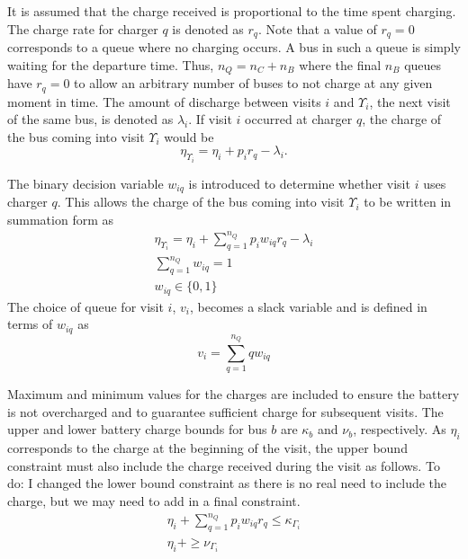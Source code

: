 \documentclass[letterpaper, 10pt, conference]{IEEEtran}
\newcommand{\TODO}[1]{{\color{green} To do: #1}}                                %
\begin{document}
It is assumed that the charge received is proportional to the time spent charging. The charge rate for charger $q$ is
denoted as $r_q$. Note that a value of $r_q = 0$ corresponds to a queue where no charging occurs. A bus in such a queue is simply waiting for the departure time. Thus, $n_Q = n_C + n_B$ where the final $n_B$ queues have $r_q = 0$ to allow an arbitrary number of buses to not charge at any given moment in time. The amount of discharge between visits $i$ and $\Upsilon_i$, the next visit of the same bus, is denoted as $\lambda_i$. If visit $i$ occurred at charger $q$, the charge of the bus coming into visit $\Upsilon_i$ would be
\begin{equation}
	\eta_{\Upsilon_i} = \eta_i + p_i r_q - \lambda_i.
\end{equation}

The binary decision variable $w_{iq}$ is introduced to determine whether visit $i$ uses charger $q$. This allows the
charge of the bus coming into visit $\Upsilon_i$ to be written in summation form as
\begin{subequations}
    \label{subeq:pre_next_charge}
\begin{align}
    \eta_{\Upsilon_i} = \eta_i + \sum_{q=1}^{n_Q} p_i w_{iq} r_q - \lambda_i  \\
    \sum_{q=1}^{n_Q} w_{iq} = 1 \\
    w_{iq} \in \{0,1\}
\end{align}
\end{subequations}
The choice of queue for visit $i$, $v_i$, becomes a slack variable and is defined in terms of $w_{iq}$ as
\begin{equation}
    v_i = \sum_{q=1}^{n_Q} qw_{iq}
\end{equation}

Maximum and minimum values for the charges are included to ensure the battery is not overcharged and to guarantee
sufficient charge for subsequent visits. The upper and lower battery charge bounds for bus $b$ are $\kappa_b$ and $\nu_b$, respectively. As $\eta_i$ corresponds to the charge at the beginning of the visit, the upper bound constraint must also include the charge received during the visit as follows.
\TODO{I changed the lower bound constraint as there is no real need to include the charge, but we may need to add in a final constraint.}
\begin{subequations}
    \label{subeq:pre_min_max}
\begin{align}
    \eta_i + \sum_{q=1}^{n_Q} p_i w_{iq} r_q \leq \kappa_{\Gamma_i}                 \\
    \eta_i + \geq \nu_{\Gamma_i}
\end{align}
\end{subequations}
\end{document}

